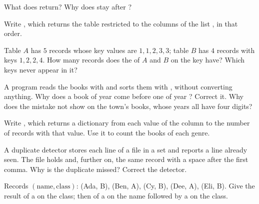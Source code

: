 \begin{exercise}[$\star$]\label{exo:g10:data-tables:2}
What does  return? Why does  stay after
?
\end{exercise}

\begin{exercise}[$\star$]\label{exo:g10:data-tables:3}
Write , which returns the table restricted to the columns of the list , in that
order.
\end{exercise}

\begin{exercise}[$\star$]\label{exo:g10:data-tables:4}
Table $A$ has $5$ records whose key values are $1, 1, 2, 3, 3$; table $B$ has $4$ records with keys $1, 2, 2, 4$. How
many records does the  of $A$ and $B$ on the key have? Which keys never appear in it?
\end{exercise}

\begin{exercise}[$\star$]\label{exo:g10:data-tables:5}
A program reads the books with  and sorts them with , without
converting anything. Why does a book of year  come before one of year ? Correct it. Why does the
mistake not show on the town's books, whose years all have four digits?
\end{exercise}

\begin{exercise}[$\star\star$]\label{exo:g10:data-tables:6}
Write , which returns a dictionary from each value of the column to the number of
records with that value. Use it to count the books of each genre.
\end{exercise}

\begin{exercise}[$\star\star$]\label{exo:g10:data-tables:7}
A duplicate detector stores each line of a file in a set and reports a line already seen. The file holds
 and, further on, the same record with a space after the first comma. Why is the
duplicate missed? Correct the detector.
\end{exercise}

\begin{exercise}[$\star\star$]\label{exo:g10:data-tables:8}
Records $(\text{name}, \text{class})$: (Ada, B), (Ben, A), (Cy, B), (Dee, A), (Eli, B). Give the result of a  on the class; then of a  on the name followed by a  on the class.
\end{exercise}

